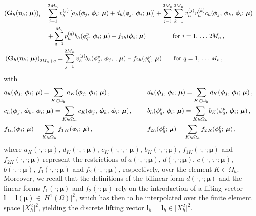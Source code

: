 \documentclass[12pt, a4paper, twoside, openright, notitlepage]{report}
\numberwithin{equation}{chapter}
\theoremstyle{theorem}
\theoremstyle{definition}
\theoremstyle{remark}
\theoremstyle{proposition}
\numberwithin{figure}{chapter}
\newcommand{\bg}[1]{\boldsymbol{#1}}
\begin{document}
		\begin{equation*}
			\begin{aligned}
				&
				\begin{aligned}
					\left( \mathbf{G}_h(\mathbf{u}_h; \, \bg{\mu}) \right)_i = & \sum_{j = 1}^{2 M_n} v_h^{(j)} \left[ a_h(\bg{\phi}_j, \, \bg{\phi}_i; \, \bg{\mu}) + d_h(\bg{\phi}_j, \, \bg{\phi}_i; \, \bg{\mu}) \right] + \sum_{j = 1}^{2 M_n} \sum_{k = 1}^{2 M_n} v_h^{(j)} v_h^{(k)} c_h(\bg{\phi}_j, \, \bg{\phi}_k, \, \bg{\phi}_i; \, \bg{\mu}) \\
					& + \sum_{q = 1}^{M_v} p_h^{(q)} b_h(\phi_q^p, \, \bg{\phi}_i; \, \bg{\mu}) - f_{1 h}(\bg{\phi}_i; \, \bg{\mu}) \hspace*{1.525cm} \text{for $i = 1, \, \ldots \, 2 M_n$} \, ,
				\end{aligned} \\
				& \left( \mathbf{G}_h(\mathbf{u}_h; \, \bg{\mu}) \right)_{2 M_n + q} = \sum_{j = 1}^{2 M_n} v_h^{(j)} b_h(\phi_q^p, \, \bg{\phi}_j, \, ; \, \bg{\mu}) - f_{2 h}(\phi_q^p; \, \bg{\mu}) \hspace*{0.7cm} \text{for $q = 1, \, \ldots \, M_v$} \, ,
			\end{aligned}
		\end{equation*}
		with
		\begin{equation*}
			\begin{aligned}
				& a_h(\bg{\phi}_j, \, \bg{\phi}_i; \, \bg{\mu}) = \sum_{K \in \Omega_h} a_K(\bg{\phi}_j, \, \bg{\phi}_i; \, \bg{\mu}) \, , && d_h(\bg{\phi}_j, \, \bg{\phi}_i; \, \bg{\mu}) = \sum_{K \in \Omega_h} d_K(\bg{\phi}_j, \, \bg{\phi}_i; \, \bg{\mu}) \, , \\
				& c_h(\bg{\phi}_j, \, \bg{\phi}_k, \, \bg{\phi}_i; \, \bg{\mu}) = \sum_{K \in \Omega_h} c_K(\bg{\phi}_j, \, \bg{\phi}_k, \, \bg{\phi}_i; \, \bg{\mu}) \, , \hspace*{0.5cm} && b_h(\phi_q^p, \, \bg{\phi}_i; \, \bg{\mu}) = \sum_{K \in \Omega_h} b_K(\phi_q^p, \, \bg{\phi}_i; \, \bg{\mu}) \, , \\
				& f_{1 h}(\bg{\phi}_i; \, \bg{\mu}) = \sum_{K \in \Omega_h} f_{1\,K}(\bg{\phi}_i; \, \bg{\mu}) \, , && f_{2 h}(\phi_q^p; \, \bg{\mu}) = \sum_{K \in \Omega_h} f_{2\,K}(\phi_q^p; \, \bg{\mu}) \, ,
			\end{aligned}
		\end{equation*}
		where $a_K(\cdot, \cdot; \bg{\mu})$, $d_K(\cdot, \cdot; \bg{\mu})$, $c_K(\cdot, \cdot, \cdot; \bg{\mu})$, $b_K(\cdot, \cdot; \bg{\mu})$, $f_{1 K}(\cdot, \cdot; \bg{\mu})$ and $f_{2 K}(\cdot, \cdot; \bg{\mu})$ represent the restrictions of $a(\cdot, \cdot; \bg{\mu})$, $d(\cdot, \cdot; \bg{\mu})$, $c(\cdot, \cdot, \cdot; \bg{\mu})$, $b(\cdot, \cdot; \bg{\mu})$, $f_{1}(\cdot, \cdot; \bg{\mu})$ and $f_{2}(\cdot, \cdot; \bg{\mu})$, respectively, over the element $K \in \Omega_h$. Moreover, we recall that the definitions of the bilinear form $d(\cdot, \cdot; \bg{\mu})$ and the linear forms $f_1(\cdot; \bg{\mu})$ and $f_2(\cdot; \bg{\mu})$ rely on the introduction of a lifting vector $\bg{l} = \bg{l}(\bg{\mu}) \in \big[ H^1(\Omega) \big]^2$, which has then to be interpolated over the finite element space $\big[ X_h^2 \big]^2$, yielding the discrete lifting vector $\bg{l}_h = \bg{l}_h \in \big[ X_h^2 \big]^2$. \\
\end{document}
